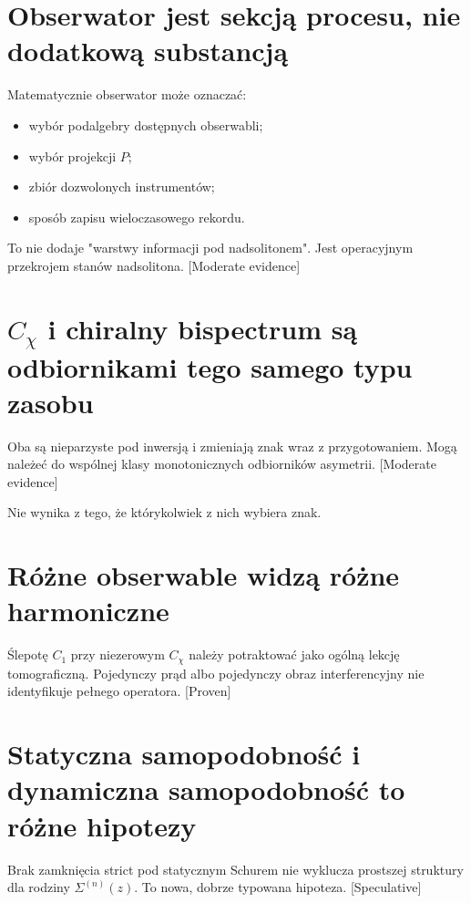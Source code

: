 \documentclass[11pt,a4paper,openany]{report}
\newcommand{\statusProven}{\textcolor{fingreen}{[Proven]}}
\newcommand{\statusModerate}{\textcolor{finviolet}{[Moderate evidence]}}
\newcommand{\statusSpeculative}{\textcolor{finorange}{[Speculative]}}
\begin{document}
\section{Obserwator jest sekcją procesu, nie dodatkową substancją}

Matematycznie obserwator mo\.ze oznaczać:

\begin{itemize}
\item 
wybór podalgebry dostępnych obserwabli;

\item 
wybór projekcji \(P\);

\item 
zbiór dozwolonych instrumentów;

\item 
sposób zapisu wieloczasowego rekordu.

\end{itemize}

To nie dodaje "warstwy informacji pod nadsolitonem". Jest operacyjnym przekrojem stanów nadsolitona. \statusModerate{}

\section{\texorpdfstring{\(C_\chi\) i chiralny bispectrum są odbiornikami tego samego typu zasobu}{C\_ i chiralny bispectrum są odbiornikami tego samego typu zasobu}}

Oba są nieparzyste pod inwersją i zmieniają znak wraz z przygotowaniem. Mogą nale\.zeć do wspólnej klasy monotonicznych odbiorników asymetrii. \statusModerate{}

Nie wynika z tego, \.ze którykolwiek z nich wybiera znak.

\section{Ró\.zne obserwable widzą ró\.zne harmoniczne}

Ślepotę \(C_1\) przy niezerowym \(C_\chi\) nale\.zy potraktować jako ogólną lekcję tomograficzną. Pojedynczy prąd albo pojedynczy obraz interferencyjny nie identyfikuje pełnego operatora. \statusProven{}

\section{Statyczna samopodobność i dynamiczna samopodobność to ró\.zne hipotezy}

Brak zamknięcia strict pod statycznym Schurem nie wyklucza prostszej struktury dla rodziny \(\Sigma^{(n)}(z)\). To nowa, dobrze typowana hipoteza. \statusSpeculative{}
\end{document}
